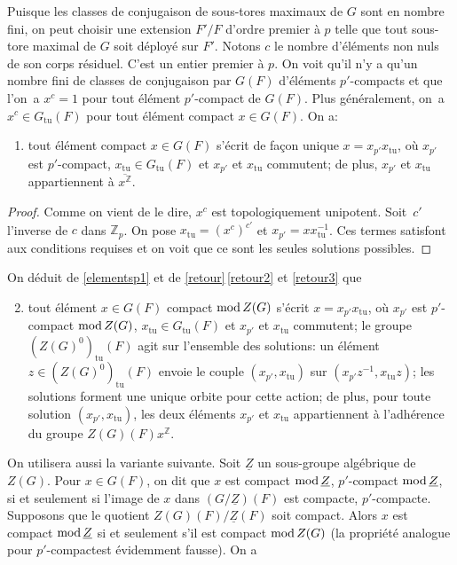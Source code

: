 \documentclass[JEP,XML,SOM,Unicode,francais]{cedram}
\newcommand{\rmod}{\textup{mod}\,}
\newcommand{\tu}{\mathrm{tu}}
\newcommand{\ZZ}{\mathbb{Z}}
\theoremstyle{plain}
\theoremstyle{definition}
\begin{document}
Puisque les classes de conjugaison de sous-tores maximaux de $G$ sont en nombre fini, on peut choisir une extension $F'/F$ d'ordre premier à $p$ telle que tout sous-tore maximal de $G$ soit déployé sur $F'$. Notons $c$ le nombre d'éléments non nuls de son corps résiduel. C'est un entier premier à $p$. On voit
qu'il n'y a qu'un nombre fini de classes de conjugaison par $G(F)$ d'éléments $p'$-compacts et que l'on~a $x^c=1$ pour tout élément $p'$-compact de $G(F)$. Plus généralement, on~a $x^c\in G_{\tu}(F)$ pour tout élément compact $x\in G(F)$. On a:
\begin{enumerate}
\item\label{elementsp1}
tout élément compact $x\in G(F)$ s'écrit de façon unique $x=x_{p'}x_{\tu}$, où $x_{p'}$ est $p'$-compact, $x_{\tu}\in G_{\tu}(F)$ et $x_{p'}$ et $x_{\tu}$ commutent; de plus, $x_{p'}$ et $x_{\tu}$ appartiennent à $\overline{x^{\ZZ}}$.
\end{enumerate}

\begin{proof}
Comme on vient de le dire, $x^c$ est topologiquement unipotent. Soit~$c'$ l'inverse de $c$ dans $\ZZ_{p}$. On pose $x_{\tu}=(x^c)^{c'}$ et $x_{p'}=xx_{\tu}^{-1}$. Ces termes satisfont aux conditions requises et on voit que ce sont les seules solutions possibles.
\end{proof}

On déduit de \eqref{elementsp1} et de \ref{retour}\,\eqref{retour2} et \eqref{retour3} que
\begin{enumerate}\setcounter{enumi}{1}
\item\label{elementsp2}
tout élément $x\in G(F)$ compact $\rmod Z(G)$ s'écrit $x=x_{p'}x_{\tu}$, où $x_{p'}$ est $p'$\nobreakdash-compact $\rmod Z(G)$, $x_{\tu}\in G_{\tu}(F)$ et $x_{p'}$ et $x_{\tu}$ commutent; le groupe $(Z(G)^0)_{\tu}(F)$ agit sur l'ensemble des solutions: un élément $z\in (Z(G)^0)_{\tu}(F)$ envoie le couple $(x_{p'},x_{\tu})$ sur $(x_{p'}z^{-1},x_{\tu}z)$; les solutions forment une unique orbite pour cette action; de plus, pour toute solution $(x_{p'},x_{\tu})$, les deux éléments $x_{p'}$ et $x_{\tu}$ appartiennent à l'adhérence du groupe $Z(G)(F)x^\ZZ$.
\end{enumerate}

On utilisera aussi la variante suivante. Soit $\underline{Z}$ un sous-groupe algébrique de $Z(G)$. Pour $x\in G(F)$, on dit que $x$ est compact $\rmod \underline{Z}$, \resp $p'$-compact $\rmod \underline{Z}$, si et seulement si l'image de $x$ dans $(G/\underline{Z})(F)$ est compacte, \resp $p'$-compacte. Supposons que le quotient $Z(G)(F)/\underline{Z}(F)$ soit compact. Alors $x$ est compact $\rmod \underline{Z}$ si et seulement s'il est compact $\rmod Z(G)$ (la propriété analogue pour \og $p'$-compact\fg est évidemment fausse). On a
\end{document}
